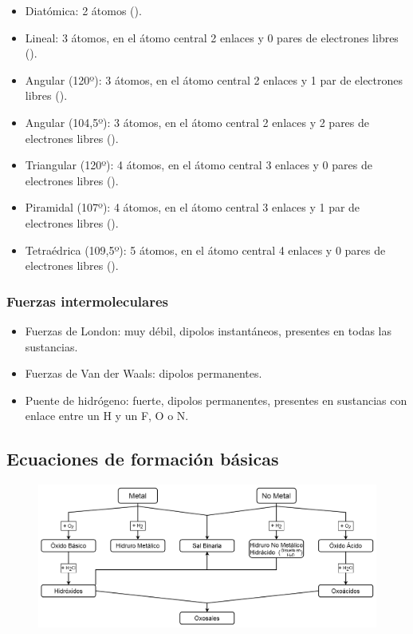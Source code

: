 \begin{itemize}
    \item Diatómica: 2 átomos ().

    \item Lineal: 3 átomos, en el átomo central 2 enlaces y 0 pares de electrones libres (). 
    \item Angular (120º): 3 átomos, en el átomo central 2 enlaces y 1 par de electrones libres ().
    \item Angular (104,5º): 3 átomos, en el átomo central 2 enlaces y 2 pares de electrones libres ().
    \item Triangular (120º): 4 átomos, en el átomo central 3 enlaces y 0 pares de electrones libres ().
    \item Piramidal (107º): 4 átomos, en el átomo central 3 enlaces y 1 par de electrones libres ().
    \item Tetraédrica (109,5º): 5 átomos, en el átomo central 4 enlaces y 0 pares de electrones libres ().
\end{itemize}


\subsubsection*{Fuerzas intermoleculares}

\begin{itemize}
    \item Fuerzas de London: muy débil, dipolos instantáneos, presentes en todas las sustancias.
    \item Fuerzas de Van der Waals: dipolos permanentes.
    \item Puente de hidrógeno: fuerte, dipolos permanentes, presentes en sustancias con enlace entre un H y un F, O o N.
\end{itemize}


\subsection*{Ecuaciones de formación básicas}

\begin{figure}[H]
    \centering
    \includegraphics[width=0.9\linewidth]{Images/ecuaciones_formacion.png}
\end{figure}

